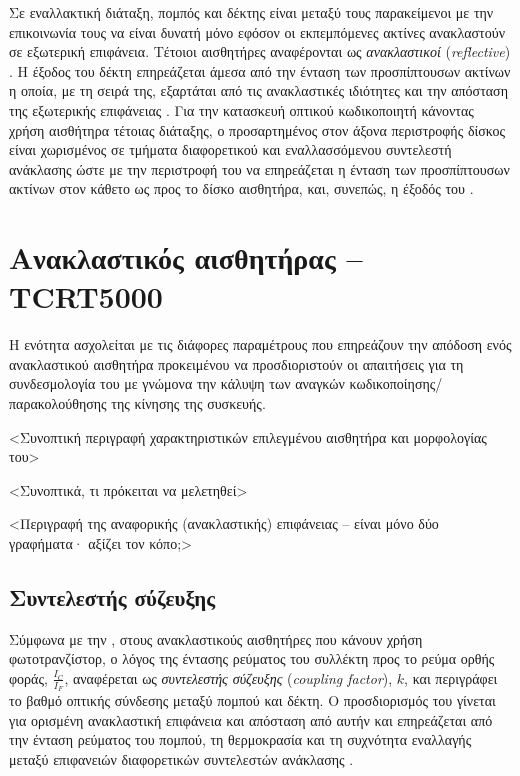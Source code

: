 Σε εναλλακτική διάταξη, πομπός και δέκτης είναι μεταξύ τους παρακείμενοι με την
επικοινωνία τους να είναι δυνατή μόνο εφόσον οι εκπεμπόμενες ακτίνες ανακλαστούν
σε εξωτερική επιφάνεια. Τέτοιοι αισθητήρες αναφέρονται ως \emph{ανακλαστικοί}
 (\emph{reflective}) \parencite[3]{lynch02}.
Η έξοδος του δέκτη επηρεάζεται άμεσα από την ένταση των προσπίπτουσων ακτίνων η
οποία, με τη σειρά της, εξαρτάται από τις ανακλαστικές ιδιότητες και την
απόσταση της εξωτερικής επιφάνειας \parencite{vishay06}. Για την κατασκευή
οπτικού κωδικοποιητή κάνοντας χρήση αισθήτηρα τέτοιας διάταξης, ο προσαρτημένος
στον άξονα περιστροφής δίσκος είναι χωρισμένος σε τμήματα διαφορετικού και
εναλλασσόμενου συντελεστή ανάκλασης ώστε με την περιστροφή του να επηρεάζεται η
ένταση των προσπίπτουσων ακτίνων στον κάθετο ως προς το δίσκο αισθητήρα, και,
συνεπώς, η έξοδός του \parencite[11]{vishay02}.

\section{Ανακλαστικός αισθητήρας -- TCRT5000}

Η ενότητα ασχολείται με τις διάφορες παραμέτρους που επηρεάζουν την απόδοση ενός
ανακλαστικού αισθητήρα προκειμένου να προσδιοριστούν οι απαιτήσεις για τη
συνδεσμολογία του με γνώμονα την κάλυψη των αναγκών κωδικοποίησης/παρακολούθησης της κίνησης
της συσκευής.

<Συνοπτική περιγραφή χαρακτηριστικών επιλεγμένου αισθητήρα και μορφολογίας του>

<Συνοπτικά, τι πρόκειται να μελετηθεί>

<Περιγραφή της αναφορικής (ανακλαστικής) επιφάνειας -- είναι μόνο δύο γραφήματα·
αξίζει τον κόπο;>

\subsection{Συντελεστής σύζευξης}

Σύμφωνα με την \textcite{vishay02}, στους ανακλαστικούς αισθητήρες που κάνουν
χρήση φωτοτρανζίστορ, ο λόγος της έντασης ρεύματος του συλλέκτη προς το ρεύμα
ορθής φοράς, $\frac{I_{C}}{I_{F}}$, αναφέρεται ως \emph{συντελεστής σύζευξης}
 (\emph{coupling factor}), $k$, και περιγράφει το
βαθμό οπτικής σύνδεσης μεταξύ πομπού και δέκτη.
Ο προσδιορισμός του γίνεται για ορισμένη ανακλαστική επιφάνεια και απόσταση από
αυτήν και επηρεάζεται από την ένταση ρεύματος του πομπού, τη θερμοκρασία και τη
συχνότητα εναλλαγής μεταξύ επιφανειών διαφορετικών συντελεστών ανάκλασης
\parencite{vishay02}.


